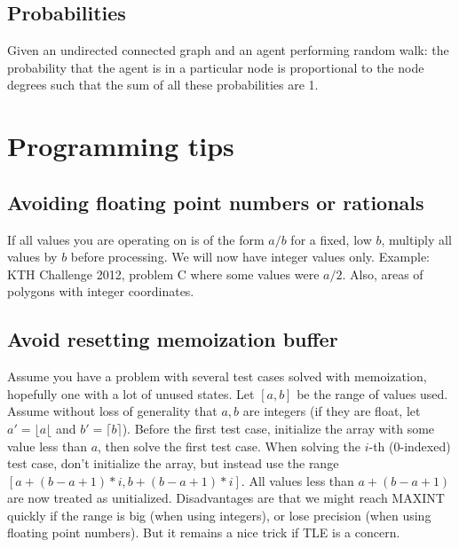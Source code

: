 \documentclass[a4paper,11pt]{article}
\begin{document}
\subsection{Probabilities}

Given an undirected connected graph and an agent performing random walk: the probability that the agent is in a particular node is proportional to the node degrees such that the sum of all these probabilities are 1.

\section{Programming tips}

\subsection{Avoiding floating point numbers or rationals}

If all values you are operating on is of the form $a/b$ for a fixed, low $b$, multiply all values by $b$ before processing. We will now have integer values only. Example: KTH Challenge 2012, problem C where some values were $a/2$. Also, areas of polygons with integer coordinates.

\subsection{Avoid resetting memoization buffer}

Assume you have a problem with several test cases solved with memoization, hopefully one with a lot of unused states. Let $[a,b]$ be the range of values used. Assume without loss of generality that $a,b$ are integers (if they are float, let $a'=\lfloor a \lfloor$ and $b'=\lceil b \rceil$). Before the first test case, initialize the array with some value less than $a$, then solve the first test case. When solving the $i$-th (0-indexed) test case, don't initialize the array, but instead use the range $[a+(b-a+1)*i,b+(b-a+1)*i]$. All values less than $a+(b-a+1)$ are now treated as unitialized. Disadvantages are that we might reach MAXINT quickly if the range is big (when using integers), or lose precision (when using floating point numbers). But it remains a nice trick if TLE is a concern.
\end{document}
